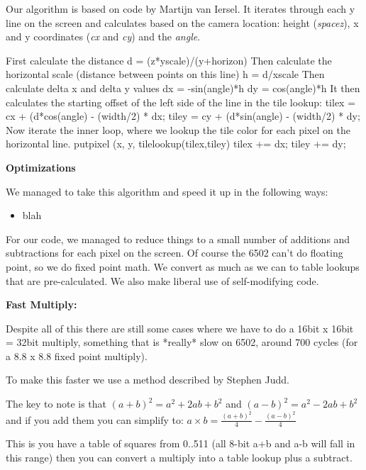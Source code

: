 \documentclass[twocolumn]{article}
\begin{document}
%

Our algorithm is based on code by Martijn van Iersel.
It iterates through each y line on the screen and calculates based on
the camera location: height ({\em spacez}), x and y coordinates 
({\em cx} and {\em cy}) and the {\em angle}.

First calculate the distance
	d = (z*yscale)/(y+horizon)
Then calculate the horizontal scale (distance between points on 
this line)
	h = d/xscale
Then calculate delta x and delta y values
	dx = -sin(angle)*h
	dy = cos(angle)*h
It then calculates the starting offset of the left side of the line in
the tile lookup:
        tilex = cx + (d*cos(angle) - (width/2) * dx;
        tiley = cy + (d*sin(angle) - (width/2) * dy;
Now iterate the inner loop, where we lookup the tile color for each pixel
on the horizontal line.
            putpixel (x, y, tilelookup(tilex,tiley)
            tilex += dx;
            tiley += dy;

{\bf Optimizations}

We managed to take this algorithm and speed it up in the following ways:
	\begin{itemize}
	\item blah 
	\end{itemize}
 
  For our code, we managed to reduce things to a small number of additions
  and subtractions for each pixel on the screen.  Of course the 6502 can't
  do floating point, so we do fixed point math.  We convert as much as we
  can to table lookups that are pre-calculated.  We also make liberal use
  of self-modifying code.

{\bf Fast Multiply:}

  Despite all of this there are still some cases where we have to do a 
  16bit x 16bit = 32bit multiply, something that is *really* slow on 6502,
  around 700 cycles (for a 8.8 x 8.8 fixed point multiply).

  To make this faster we use a method described by Stephen Judd.

  The key to note is that $(a+b)^{2} = a^{2}+2ab+b^{2}$ 
	and $(a-b)^{2}=a^{2}-2ab+b^{2}$
  and if you add them you can simplify to:
	$a\times b =\frac{(a+b)^{2}}{4} - \frac{(a-b)^2}{4}$

  This is you have a table of squares from 0..511 (all 8-bit a+b and a-b
  will fall in this range) then you can convert a multiply into a table
  lookup plus a subtract.
\end{document}
